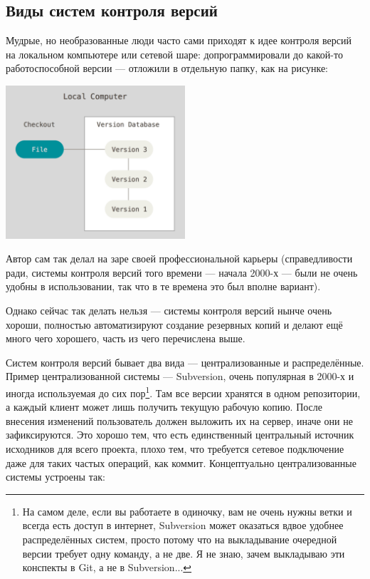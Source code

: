 \documentclass{../../text-style}
\begin{document}
\subsection{Виды систем контроля версий}

Мудрые, но необразованные люди часто сами приходят к идее контроля версий на локальном компьютере или сетевой шаре: допрограммировали до какой-то работоспособной версии --- отложили в отдельную папку, как на рисунке:

\begin{center}
    \includegraphics[width=0.5\textwidth]{localCopies.png}
\end{center}

Автор сам так делал на заре своей профессиональной карьеры (справедливости ради, системы контроля версий того времени --- начала 2000-х --- были не очень удобны в использовании, так что в те времена это был вполне вариант).

Однако сейчас так делать нельзя --- системы контроля версий нынче очень хороши, полностью автоматизируют создание резервных копий и делают ещё много чего хорошего, часть из чего перечислена выше. 

Систем контроля версий бывает два вида --- централизованные и распределённые. Пример централизованной системы --- Subversion, очень популярная в 2000-х и иногда используемая до сих пор\footnote{На самом деле, если вы работаете в одиночку, вам не очень нужны ветки и всегда есть доступ в интернет, Subversion может оказаться вдвое удобнее распределённых систем, просто потому что на выкладывание очередной версии требует одну команду, а не две. Я не знаю, зачем выкладываю эти конспекты в Git, а не в Subversion...}. Там все версии хранятся в одном репозитории, а каждый клиент может лишь получить текущую рабочую копию. После внесения изменений пользователь должен выложить их на сервер, иначе они не зафиксируются. Это хорошо тем, что есть единственный центральный источник исходников для всего проекта, плохо тем, что требуется сетевое подключение даже для таких частых операций, как коммит. Концептуально централизованные системы устроены так:
\end{document}
